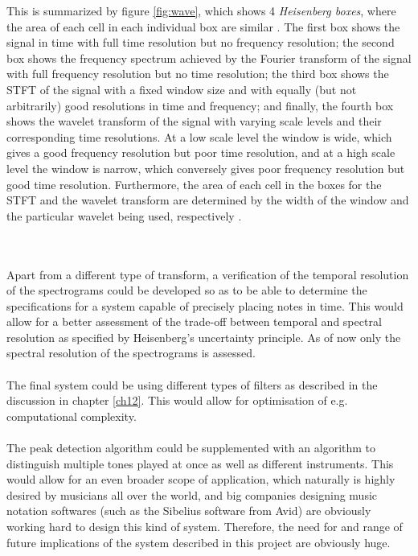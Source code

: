 This is summarized by figure \ref{fig:wave}, which shows 4 \textit{Heisenberg boxes}, where the area of each cell in each individual box are similar \cite{page 410, Wang}. The first box shows the signal in time with full time resolution but no frequency resolution; the second box shows the frequency spectrum achieved by the Fourier transform of the signal with full frequency resolution but no time resolution; the third box shows the STFT of the signal with a fixed window size and with equally (but not arbitrarily) good resolutions in time and frequency; and finally, the fourth box shows the wavelet transform of the signal with varying scale levels and their corresponding time resolutions. At a low scale level the window is wide, which gives a good frequency resolution but poor time resolution, and at a high scale level the window is narrow, which conversely gives poor frequency resolution but good time resolution. Furthermore, the area of each cell in the boxes for the STFT and the wavelet transform are determined by the width of the window and the particular wavelet being used, respectively \cite{pages 409-410, Wang} \cite{page 43-44, wave_tut}.


\\ \\
Apart from a different type of transform, a verification of the temporal resolution of the spectrograms could be developed so as to be able to determine the specifications for a system capable of precisely placing notes in time. This would allow for a better assessment of the trade-off between temporal and spectral resolution as specified by Heisenberg's uncertainty principle. As of now only the spectral resolution of the spectrograms is assessed.
\\\\
The final system could be using different types of filters as described in the discussion in chapter \ref{ch12}. This would allow for optimisation of e.g. computational complexity.
\\\\

The peak detection algorithm could be supplemented with an algorithm to distinguish multiple tones played at once as well as different instruments. This would allow for an even broader scope of application, which naturally is highly desired by musicians all over the world, and big companies designing music notation softwares (such as the Sibelius software from Avid) are obviously working hard to design this kind of system. Therefore, the need for and range of future implications of the system described in this project are obviously huge.
